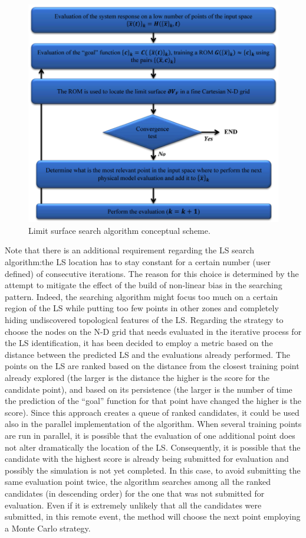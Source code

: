 \begin{figure}[h!]
  \centering
  \includegraphics[width=1.0\textwidth]  {pics/LimitSurfaceAlgoFlow.png}
  \caption{Limit surface search algorithm conceptual scheme.}
  \label{fig:LimitSurfaceAlgoFlow}
\end{figure}
Note that there is an additional requirement 
regarding the LS search algorithm:the LS location 
has to stay constant for a certain number (user defined) of consecutive 
iterations. The reason for this choice is determined by the attempt to 
mitigate the effect of the build of non-linear bias in the searching 
pattern. Indeed, the searching algorithm might focus too much on a 
certain region of the LS while putting too few points in other zones 
and completely hiding undiscovered topological features of the LS.
Regarding the strategy to choose the nodes on the N-D grid that 
needs evaluated in the iterative process for the LS identification, it has
been decided to employ a metric based on the 
distance between the predicted LS and the evaluations already 
performed. The points on the LS are ranked based on the distance 
from the closest training point already explored (the larger is the 
distance the higher is the score for the candidate point), and based on 
its persistence (the larger is the number of time the prediction of the 
``goal'' function for that point have changed the higher is the score).
Since this approach creates a queue of ranked candidates, it could be 
used also in the parallel implementation of the algorithm. When 
several training points are run in parallel, it is possible that the 
evaluation of one additional point does not alter dramatically the 
location of the LS. Consequently, it is possible that the candidate with 
the highest score is already being submitted for evaluation and 
possibly the simulation is not yet completed. In this case, to avoid 
submitting the same evaluation point twice, the algorithm searches 
among all the ranked candidates (in descending order) for the one 
that was not submitted for evaluation. Even if it is extremely unlikely 
that all the candidates were submitted, in this remote event, the 
method will choose the next point employing a Monte Carlo strategy.
